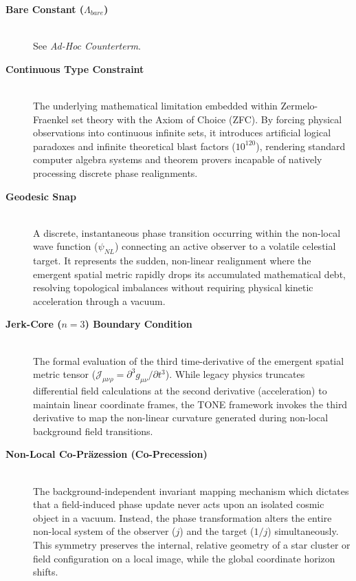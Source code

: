 \documentclass[11pt,a4paper]{article}
\theoremstyle{plain}
\theoremstyle{definition}
\begin{document}
\begin{description}
    \item[\textbf{Bare Constant ($\Lambda_{bare}$)}] \hfill \\
    See \textit{Ad-Hoc Counterterm}.

    \item[\textbf{Continuous Type Constraint}] \hfill \\
    The underlying mathematical limitation embedded within Zermelo-Fraenkel set theory with the Axiom of Choice (ZFC). By forcing physical observations into continuous infinite sets, it introduces artificial logical paradoxes and infinite theoretical blast factors ($10^{120}$), rendering standard computer algebra systems and theorem provers incapable of natively processing discrete phase realignments.

    \item[\textbf{Geodesic Snap}] \hfill \\
    A discrete, instantaneous phase transition occurring within the non-local wave function ($\psi_{NL}$) connecting an active observer to a volatile celestial target. It represents the sudden, non-linear realignment where the emergent spatial metric rapidly drops its accumulated mathematical debt, resolving topological imbalances without requiring physical kinetic acceleration through a vacuum.

    \item[\textbf{Jerk-Core ($n=3$) Boundary Condition}] \hfill \\
    The formal evaluation of the third time-derivative of the emergent spatial metric tensor ($\mathcal{J}_{\mu\nu\rho} = \partial^3 g_{\mu\nu} / \partial t^3$). While legacy physics truncates differential field calculations at the second derivative (acceleration) to maintain linear coordinate frames, the TONE framework invokes the third derivative to map the non-linear curvature generated during non-local background field transitions.

    \item[\textbf{Non-Local Co-Präzession (Co-Precession)}] \hfill \\
    The background-independent invariant mapping mechanism which dictates that a field-induced phase update never acts upon an isolated cosmic object in a vacuum. Instead, the phase transformation alters the entire non-local system of the observer ($j$) and the target ($1/j$) simultaneously. This symmetry preserves the internal, relative geometry of a star cluster or field configuration on a local image, while the global coordinate horizon shifts.


\end{description}
\end{document}
